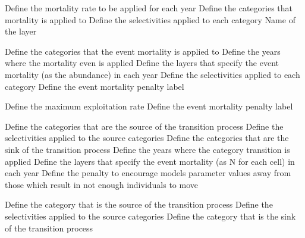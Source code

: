  {Define the mortality rate to be applied for each year}
 {Define the categories that mortality is applied to}
 {Define the selectivities applied to each category}
 {Name of the layer}
\par\textbf{}\par
{} {Define the categories that the event mortality is applied to}
 {Define the years where the mortality even is applied}
 {Define the layers that specify the event mortality (as the abundance) in each year}
 {Define the selectivities applied to each category}
 {Define the event mortality penalty label}
\par\textbf{}\par
{}
 {Define the maximum exploitation rate}
 {Define the event mortality penalty label}
\par\textbf{}\par
{} {Define the categories that are the source of the transition process}
 {Define the selectivities applied to the source categories}
 {Define the categories that are the sink of the transition process}
 {Define the years where the category transition is applied}
 {Define the layers that specify the event mortality (as N for each cell) in each year}
 {Define the penalty to encourage models parameter values away from those which result in not enough individuals to move}
\par\textbf{}\par
{} {Define the category that is the source of the transition process}
 {Define the selectivities applied to the source categories}
 {Define the category that is the sink of the transition process}
